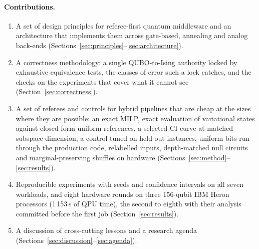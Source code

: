 \documentclass[11pt,a4paper]{article}
\begin{document}
\paragraph{Contributions.}
\begin{enumerate}
  \item A set of design principles for referee-first quantum middleware and an
        architecture that implements them across gate-based, annealing and
        analog back-ends (Sections~\ref{sec:principles}--\ref{sec:architecture}).
  \item A correctness methodology: a single QUBO-to-Ising authority locked
        by exhaustive equivalence tests, the classes of error such a lock
        catches, and the checks on the experiments that cover what it
        cannot see (Section~\ref{sec:correctness}).
  \item A set of referees and controls for hybrid pipelines that are cheap
        at the sizes where they are possible: an exact MILP, exact evaluation
        of variational states against closed-form uniform references, a
        selected-CI curve at matched subspace dimension, a control tuned on
        held-out instances, uniform bits run through the production code,
        relabelled inputs, depth-matched null circuits and
        marginal-preserving shuffles on hardware
        (Sections~\ref{sec:method}--\ref{sec:results}).
  \item Reproducible experiments with seeds and confidence intervals on all
        seven workloads, and eight hardware rounds on three 156-qubit IBM Heron
        processors (1\,153\,s of QPU time), the second to eighth with their
        analysis committed before the first job (Section~\ref{sec:results}).
  \item A discussion of cross-cutting lessons and a research agenda
        (Sections~\ref{sec:discussion}--\ref{sec:agenda}).
\end{enumerate}
\end{document}
